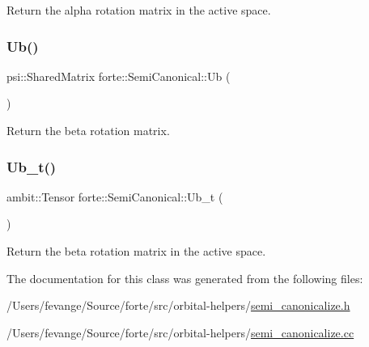 Return the alpha rotation matrix in the active space. 

\mbox{\label{classforte_1_1_semi_canonical_a3e7fd1795a15e6c0515e33e8fc62a257}} 
\subsubsection{\texorpdfstring{Ub()}{Ub()}}
{\footnotesize\ttfamily psi\+::\+Shared\+Matrix forte\+::\+Semi\+Canonical\+::\+Ub (\begin{DoxyParamCaption}{ }\end{DoxyParamCaption})\hspace{0.3cm}{\ttfamily [inline]}}



Return the beta rotation matrix. 

\mbox{\label{classforte_1_1_semi_canonical_aa36c3435c15beab082a8e14e054b3f13}} 
\subsubsection{\texorpdfstring{Ub\+\_\+t()}{Ub\_t()}}
{\footnotesize\ttfamily ambit\+::\+Tensor forte\+::\+Semi\+Canonical\+::\+Ub\+\_\+t (\begin{DoxyParamCaption}{ }\end{DoxyParamCaption})\hspace{0.3cm}{\ttfamily [inline]}}



Return the beta rotation matrix in the active space. 



The documentation for this class was generated from the following files\+:\begin{DoxyCompactItemize}
\item 
/\+Users/fevange/\+Source/forte/src/orbital-\/helpers/\mbox{\hyperlink{semi__canonicalize_8h}{semi\+\_\+canonicalize.\+h}}\item 
/\+Users/fevange/\+Source/forte/src/orbital-\/helpers/\mbox{\hyperlink{semi__canonicalize_8cc}{semi\+\_\+canonicalize.\+cc}}\end{DoxyCompactItemize}
